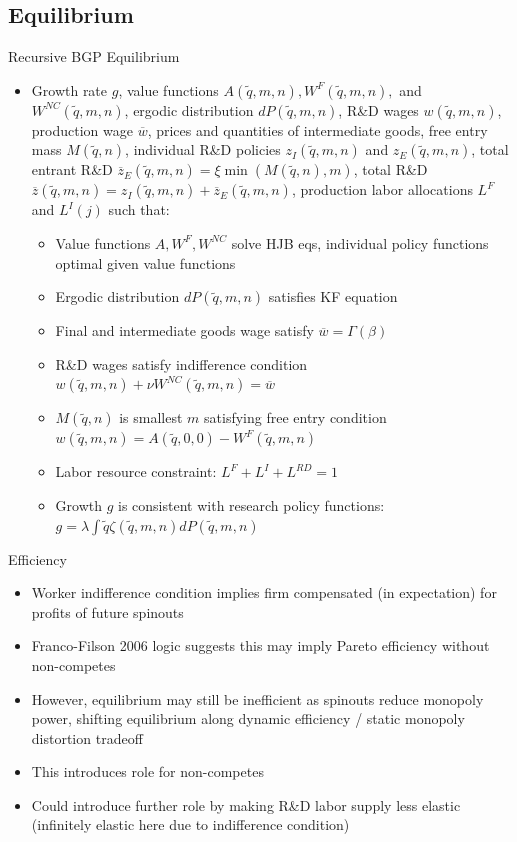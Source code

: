 \documentclass[english,usenames,dvipsnames]{beamer}
\begin{document}
\subsection{Equilibrium}
\begin{frame}{Recursive BGP Equilibrium}
\begin{itemize}
	\footnotesize
	\item Growth rate $g$, value functions $A(\tilde{q},m,n),W^F(\tilde{q},m,n),$ and $ W^{NC}(\tilde{q},m,n)$, ergodic distribution $dP(\tilde{q},m,n)$, R\&D wages $w(\tilde{q},m,n)$, production wage $\overline{w}$, prices and quantities of intermediate goods, free entry mass $M(\tilde{q},n)$, individual R\&D policies $z_I(\tilde{q},m,n)$ and $z_E(\tilde{q},m,n)$, total entrant R\&D $\overline{z}_E(\tilde{q},m,n) = \xi \min(M(\tilde{q},n),m)$, total R\&D $\overline{z}(\tilde{q},m,n) = z_I(\tilde{q},m,n) + \overline{z}_E(\tilde{q},m,n)$, production labor allocations $L^F$ and $L^I(j)$ such that:
	\begin{itemize}
		\footnotesize
		\item Value functions $A,W^F,W^{NC}$ solve HJB eqs, individual policy functions optimal given value functions
		\item Ergodic distribution $dP(\tilde{q},m,n)$ satisfies KF equation 
		\item Final and intermediate goods wage satisfy $\overline{w} = \Gamma(\beta)$
		\item R\&D wages satisfy indifference condition $w(\tilde{q},m,n) + \nu W^{NC}(\tilde{q},m,n) = \overline{w}$
		\item $M(\tilde{q},n)$ is smallest $m$ satisfying free entry condition $w(\tilde{q},m,n) = A(\tilde{q},0,0) - W^F(\tilde{q},m,n)$
		\item Labor resource constraint: $L^F + L^I + L^{RD} = 1$
		\item Growth $g$ is consistent with research policy functions: $g = \lambda \int \tilde{q} \zeta(\tilde{q},m,n)dP(\tilde{q},m,n)$
	\end{itemize} 
\end{itemize}
\end{frame}

\begin{frame}{Efficiency}
\begin{itemize}
	\item Worker indifference condition implies firm compensated (in expectation) for profits of future spinouts
	\item Franco-Filson 2006 logic suggests this may imply Pareto efficiency without non-competes
	\item However, equilibrium may still be inefficient as spinouts reduce monopoly power, shifting equilibrium along dynamic efficiency / static monopoly distortion tradeoff
	\item This introduces role for non-competes 
	\item Could introduce further role by making R\&D labor supply less elastic (infinitely elastic here due to indifference condition)
\end{itemize}
\end{frame}
\end{document}
